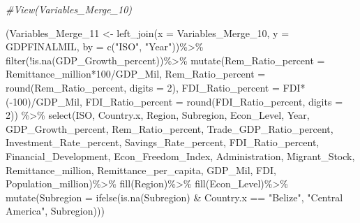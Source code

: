 \documentclass[
]{article}
\newenvironment{Shaded}{\begin{snugshade}}{\end{snugshade}}
\newcommand{\AttributeTok}[1]{\textcolor[rgb]{0.77,0.63,0.00}{#1}}
\newcommand{\CommentTok}[1]{\textcolor[rgb]{0.56,0.35,0.01}{\textit{#1}}}
\newcommand{\DecValTok}[1]{\textcolor[rgb]{0.00,0.00,0.81}{#1}}
\newcommand{\FunctionTok}[1]{\textcolor[rgb]{0.00,0.00,0.00}{#1}}
\newcommand{\NormalTok}[1]{#1}
\newcommand{\OtherTok}[1]{\textcolor[rgb]{0.56,0.35,0.01}{#1}}
\newcommand{\SpecialCharTok}[1]{\textcolor[rgb]{0.00,0.00,0.00}{#1}}
\newcommand{\StringTok}[1]{\textcolor[rgb]{0.31,0.60,0.02}{#1}}
\begin{document}
\begin{Shaded}
\begin{Highlighting}[]
\CommentTok{\#View(Variables\_Merge\_10)}

\NormalTok{(Variables\_Merge\_11 }\OtherTok{\textless{}{-}} \FunctionTok{left\_join}\NormalTok{(}\AttributeTok{x =}\NormalTok{ Variables\_Merge\_10, }\AttributeTok{y =}\NormalTok{ GDPFINALMIL, }\AttributeTok{by =} \FunctionTok{c}\NormalTok{(}\StringTok{"ISO"}\NormalTok{, }\StringTok{"Year"}\NormalTok{))}\SpecialCharTok{\%\textgreater{}\%}
  \FunctionTok{filter}\NormalTok{(}\SpecialCharTok{!}\FunctionTok{is.na}\NormalTok{(GDP\_Growth\_percent))}\SpecialCharTok{\%\textgreater{}\%}
  \FunctionTok{mutate}\NormalTok{(}\AttributeTok{Rem\_Ratio\_percent =}\NormalTok{ Remittance\_million}\SpecialCharTok{*}\DecValTok{100}\SpecialCharTok{/}\NormalTok{GDP\_Mil, }\AttributeTok{Rem\_Ratio\_percent =} \FunctionTok{round}\NormalTok{(Rem\_Ratio\_percent, }\AttributeTok{digits =} \DecValTok{2}\NormalTok{), }\AttributeTok{FDI\_Ratio\_percent =}\NormalTok{ FDI}\SpecialCharTok{*}\NormalTok{(}\SpecialCharTok{{-}}\DecValTok{100}\NormalTok{)}\SpecialCharTok{/}\NormalTok{GDP\_Mil, }\AttributeTok{FDI\_Ratio\_percent =} \FunctionTok{round}\NormalTok{(FDI\_Ratio\_percent, }\AttributeTok{digits =} \DecValTok{2}\NormalTok{)) }\SpecialCharTok{\%\textgreater{}\%}
  \FunctionTok{select}\NormalTok{(ISO, Country.x, Region, Subregion, Econ\_Level, Year, GDP\_Growth\_percent, Rem\_Ratio\_percent, Trade\_GDP\_Ratio\_percent, Investment\_Rate\_percent, Savings\_Rate\_percent, FDI\_Ratio\_percent, Financial\_Development, Econ\_Freedom\_Index, Administration, Migrant\_Stock, Remittance\_million, Remittance\_per\_capita, GDP\_Mil, FDI, Population\_million)}\SpecialCharTok{\%\textgreater{}\%}
\FunctionTok{fill}\NormalTok{(Region)}\SpecialCharTok{\%\textgreater{}\%}
\FunctionTok{fill}\NormalTok{(Econ\_Level)}\SpecialCharTok{\%\textgreater{}\%}
\FunctionTok{mutate}\NormalTok{(}\AttributeTok{Subregion =} \FunctionTok{ifelse}\NormalTok{(}\FunctionTok{is.na}\NormalTok{(Subregion) }\SpecialCharTok{\&}\NormalTok{ Country.x }\SpecialCharTok{==} \StringTok{"Belize"}\NormalTok{, }\StringTok{"Central America"}\NormalTok{, Subregion)))}
\end{Highlighting}
\end{Shaded}
\end{document}
